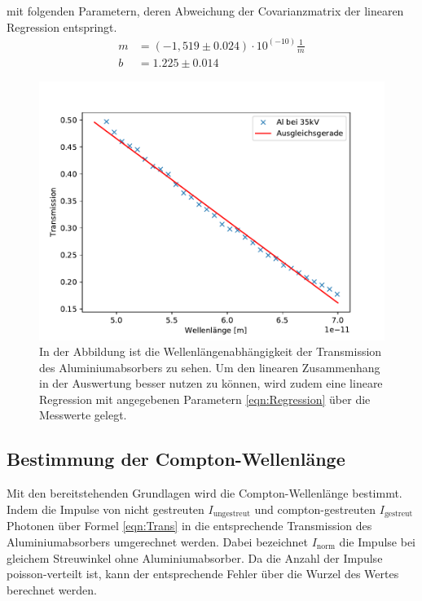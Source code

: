 \documentclass[titlepage = firstcover]{scrartcl}
\begin{document}
        \noindent
        mit folgenden Parametern, deren Abweichung der Covarianzmatrix der linearen Regression entspringt.
        \begin{align}
            m &= (-1,519 \pm 0.024) \cdot 10^{(-10)} \frac{1}{m} \\
            b &= 1.225 \pm 0.014
            \label{eqn:Parameter}
        \end{align}
        \FloatBarrier
        \begin{figure}[h]
            \centering
            \includegraphics[width = 0.9\linewidth]{Compton_Alu.pdf}
            \caption{In der Abbildung ist die Wellenlängenabhängigkeit der Transmission des Aluminiumabsorbers zu sehen. Um den linearen Zusammenhang in der Auswertung besser nutzen zu können, wird zudem eine lineare Regression mit angegebenen Parametern \ref{eqn:Regression} über die Messwerte gelegt.}
            \label{fig:Transmission}
        \end{figure}
        \FloatBarrier

        \subsection{Bestimmung der Compton-Wellenlänge}
        Mit den bereitstehenden Grundlagen wird die Compton-Wellenlänge bestimmt. Indem die Impulse von nicht gestreuten $I_{\text{ungestreut}}$ 
        und compton-gestreuten $I_{\text{gestreut}}$ Photonen über Formel \ref{eqn:Trans} in die entsprechende Transmission des Aluminiumabsorbers umgerechnet
        werden. Dabei bezeichnet $I_{\text{norm}}$ die Impulse bei gleichem Streuwinkel ohne Aluminiumabsorber. Da die Anzahl der Impulse poisson-verteilt 
        ist, kann der entsprechende Fehler über die Wurzel des Wertes berechnet werden.
\end{document}
